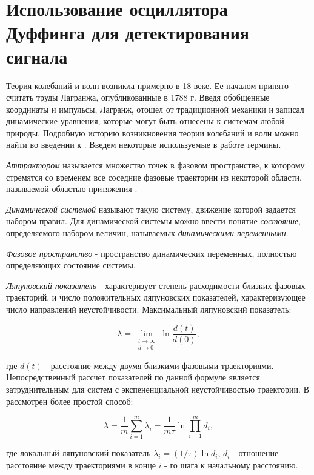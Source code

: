 \section{Использование осциллятора Дуффинга для детектирования сигнала}
Теория колебаний и волн возникла примерно в 18 веке. Ее началом принято считать труды Лагранжа, опубликованные в 1788 г. Введя обобщенные
координаты и импульсы, Лагранж, отошел от традиционной механики и записал динамические уравнения, которые могут быть отнесены к системам
любой природы. Подробную историю возникновения теории колебаний и волн можно найти во введении к \cite{landa_book}. 
Введем некоторые используемые в работе термины.

\emph{Аттрактором} называется множество точек в фазовом пространстве, к которому стремятся со
временем все соседние фазовые траектории из некоторой области, называемой областью притяжения \cite{landa_book}.

\emph{Динамической системой} называют такую систему, движение которой задается набором правил. Для динамической системы можно ввести
понятие \emph{состояние}, определяемого набором величин, называемых \emph{динамическими переменными}.

\emph{Фазовое пространство} - пространство динамических переменных, полностью определяющих состояние системы.

\emph{Ляпуновский показатель} - 
характеризует степень расходимости близких фазовых траекторий, и число положительных ляпуновских показателей, характеризующее число направлений
неустойчивости. Максимальный ляпуновский показатель:
\begin{center}
\begin{equation}
	\label{eq:exp_lyapunova_1}
	\lambda = \lim_{\substack{t \to \infty\\d \to 0}}\ln \frac{d(t)}{d(0)},
\end{equation}
\end{center}
где ${d(t)}$ - расстояние между двумя близкими фазовыми траекториями. Непосредственный рассчет показателей по данной формуле является
затруднительным для систем с экспененциальной неустойчивостью траектории. В \cite{landa_book} рассмотрен более простой способ:
\begin{center}
\begin{equation}
	\label{eq:exp_lyapunova_2}
	\lambda = \frac{1}{m}\sum \limits_{i=1}^m \lambda_i = \frac{1}{m\tau}\ln\prod \limits_{i=1}^md_i,
\end{equation}
\end{center}
где локальный ляпуновский показатель ${\lambda_i}=(1/ \tau)\ln d_i$, ${d_i}$ - отношение расстояние между траекториями в конце ${i}$ - го
шага к начальному расстоянию.

